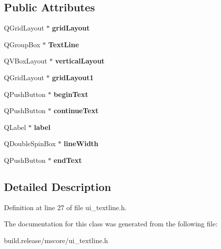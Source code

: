 \subsection*{Public Attributes}
\begin{DoxyCompactItemize}
\item 
\mbox{\label{class_ui___text_line_base_a04334a88a88392dff26fa326e5ae1d50}} 
Q\+Grid\+Layout $\ast$ {\bfseries grid\+Layout}
\item 
\mbox{\label{class_ui___text_line_base_a990610a12de2106b2071818b79d11ed5}} 
Q\+Group\+Box $\ast$ {\bfseries Text\+Line}
\item 
\mbox{\label{class_ui___text_line_base_a4aea66852400b5bbd821e58917fb0912}} 
Q\+V\+Box\+Layout $\ast$ {\bfseries vertical\+Layout}
\item 
\mbox{\label{class_ui___text_line_base_a5e600d3b90b3f8ece1bbdea13fd922a8}} 
Q\+Grid\+Layout $\ast$ {\bfseries grid\+Layout1}
\item 
\mbox{\label{class_ui___text_line_base_a871c0d93e62e273bcd383f3a996c21cb}} 
Q\+Push\+Button $\ast$ {\bfseries begin\+Text}
\item 
\mbox{\label{class_ui___text_line_base_a1d3b0587b6be210b9d612fbf00371515}} 
Q\+Push\+Button $\ast$ {\bfseries continue\+Text}
\item 
\mbox{\label{class_ui___text_line_base_a8651c1cbc16d588c46e38427c5f5dc3c}} 
Q\+Label $\ast$ {\bfseries label}
\item 
\mbox{\label{class_ui___text_line_base_a74fa6e603e2117a099ececef5468ed90}} 
Q\+Double\+Spin\+Box $\ast$ {\bfseries line\+Width}
\item 
\mbox{\label{class_ui___text_line_base_aff17b1c64dfd9d231ef20bb14dacc327}} 
Q\+Push\+Button $\ast$ {\bfseries end\+Text}
\end{DoxyCompactItemize}


\subsection{Detailed Description}


Definition at line 27 of file ui\+\_\+textline.\+h.



The documentation for this class was generated from the following file\+:\begin{DoxyCompactItemize}
\item 
build.\+release/mscore/ui\+\_\+textline.\+h\end{DoxyCompactItemize}
